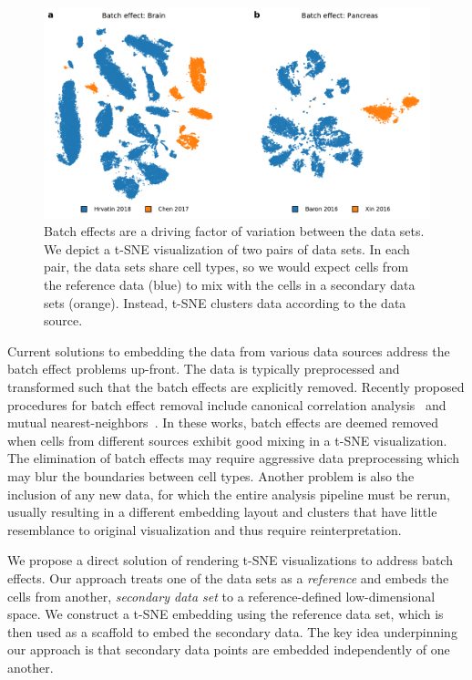 \documentclass[runningheads]{llncs}
\begin{document}
\begin{figure}[htbp]
  \includegraphics[width=\textwidth]{batch_effect.pdf}
  \caption{Batch effects are a driving factor of variation between the data
  sets. We depict a t-SNE visualization of two pairs of data sets. In each
  pair, the data sets share cell types, so we would expect cells
  from the reference data (blue) to mix with the cells in a secondary data
  sets (orange). Instead, t-SNE clusters data according to the
  data source.}
  \label{fig:batch_effect}
\end{figure}

Current solutions to embedding the data from various data sources address the
batch effect problems up-front. The data is typically preprocessed and
transformed such that the batch effects are explicitly removed. Recently
proposed procedures for batch effect removal include canonical correlation
analysis~\cite{Butler2018} and mutual
nearest-neighbors~\cite{Haghverdi2018,Stuart2019}.  In these works, batch
effects are deemed removed when cells from different sources exhibit good mixing
in a t-SNE visualization. The elimination of batch effects may require
aggressive data preprocessing which may blur the boundaries between cell types.
Another problem is also the inclusion of any new data, for which the entire
analysis pipeline must be rerun, usually resulting in a different embedding
layout and clusters that have little resemblance to original visualization and
thus require reinterpretation.

We propose a direct solution of rendering t-SNE visualizations to address
batch effects. Our approach treats one of the data sets as a {\em reference}
and embeds the cells from another, {\em secondary data set} to a reference-defined
low-dimensional space.  We construct a t\nobreakdash -SNE embedding using the
reference data set, which is then used as a scaffold to embed the
secondary data. The key idea underpinning our approach is that secondary data
points are embedded independently of one another.
\end{document}
